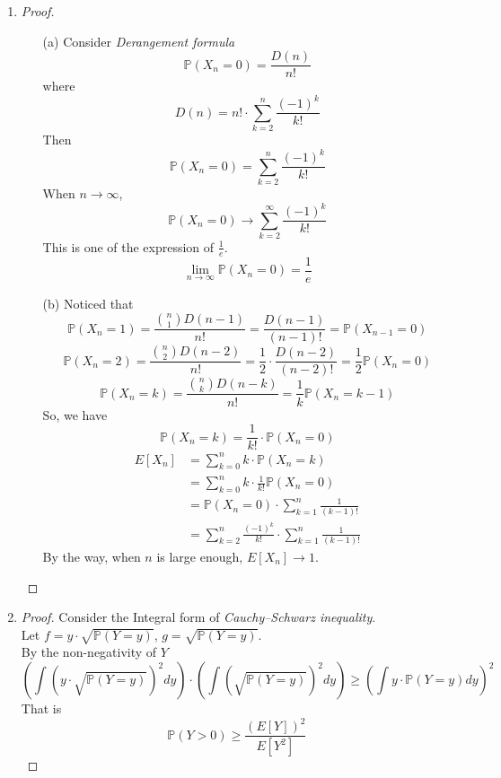 \documentclass{article}
\begin{document}
\begin{enumerate}
        \item \begin{proof}
            \indent
            \begin{itemize}
                \item[(a)]
                    Consider \textit{Derangement formula}
                    $$\mathbb{P}(X_n=0)=\frac{D(n)}{n!}$$
                    where $$D(n)=n!\cdot \sum_{k=2}^{n}\frac{(-1)^k}{k!}$$
                    Then $$\mathbb{P}(X_n=0)=\sum_{k=2}^{n}\frac{(-1)^k}{k!}$$
                    When $n\to \infty$,
                    $$\mathbb{P}(X_n=0)\to\sum_{k=2}^{\infty}\frac{(-1)^k}{k!}$$
                    This is one of the expression of $\frac{1}{e}$.
                    $$\lim_{n\to\infty} \mathbb{P}(X_n=0)=\frac{1}{e}$$
                \item[(b)]
                    Noticed that
                    $$\mathbb{P}(X_n=1) = \frac{{n \choose 1}D(n-1)}{n!}=\frac{D(n-1)}{(n-1)!}=\mathbb{P}(X_{n-1}=0)$$
                    $$\mathbb{P}(X_n=2) = \frac{{n \choose 2}D(n-2)}{n!}=\frac{1}{2}\cdot\frac{D(n-2)}{(n-2)!}=\frac{1}{2}\mathbb{P}(X_{n}=0)$$
                    $$\mathbb{P}(X_n=k) = \frac{{n \choose k}D(n-k)}{n!}=\frac{1}{k}\mathbb{P}(X_n=k-1)$$
                    So, we have
                    $$\mathbb{P}(X_n=k)=\frac{1}{k!}\cdot \mathbb{P}(X_n=0)$$
                    \begin{align*}
                        E[X_n]&=\sum_{k=0}^n k\cdot \mathbb{P}(X_n=k)\\
                        &=\sum_{k=0}^n k\cdot \frac{1}{k!}\mathbb{P}(X_n=0)\\
                        &=\mathbb{P}(X_n=0)\cdot\sum_{k=1}^n \frac{1}{(k-1)!}\\
                        &=\sum_{k=2}^n \frac{(-1)^k}{k!}\cdot \sum_{k=1}^n\frac{1}{(k-1)!}
                    \end{align*}
                    By the way, when $n$ is large enough, $E[X_n] \to 1$.
            \end{itemize}
        \end{proof}

        \item \begin{proof}
            Consider the Integral form of \textit{Cauchy–Schwarz inequality}.\\
            Let $f = y \cdot \sqrt{\mathbb{P}(Y=y)}$, $g=\sqrt{\mathbb{P}(Y=y)}$.\\
            By the non-negativity of $Y$
            $$\left(\int\left(y\cdot \sqrt{\mathbb{P}(Y=y)}\right)^2 dy\right)
            \cdot \left(
            \int\left(\sqrt{\mathbb{P}(Y=y)}\right)^2 dy\right)
            \geqslant \left(\int y\cdot \mathbb{P}(Y=y) dy \right)^2$$
            That is
            $$\mathbb{P}(Y>0) \geqslant \frac{\left(E[Y]\right)^2}{E[Y^2]}$$
        \end{proof}


\end{enumerate}
\end{document}
